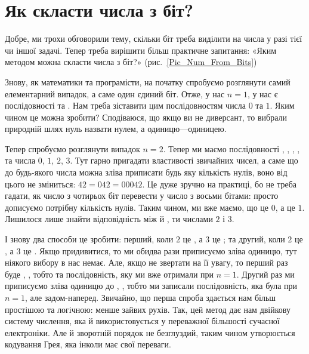 \section{Як скласти числа з біт?}

Добре, ми трохи обговорили тему, скільки біт треба виділити на числа у разі тієї чи іншої задачі.
Тепер треба вирішити більш практичне запитання: «Яким методом можна скласти числа з біт?» (рис.~\ref{Pic_Num_From_Bits})


Знову, як математики та програмісти, на початку спробуємо розглянути самий елементарний випадок, а саме один єдиний біт.
Отже, у нас $n=1$, у нас є послідовності  та .
Нам треба зіставити цим послідовностям числа $0$ та $1$.
Яким чином це можна зробити?
Сподіваюся, що якщо ви не диверсант, то вибрали природній шлях нуль назвати нулем, а одиницю---одиницею.

Тепер спробуємо розглянути випадок $n=2$.
Тепер ми маємо послідовності , , , , та числа $0$, $1$, $2$, $3$.
Тут гарно пригадати властивості звичайних чисел, а саме що до будь-якого числа можна зліва приписати будь яку кількість нулів, воно від цього не зміниться: $42 = 042 = 00042$.
Це дуже зручно на практиці, бо не треба гадати, як число з чотирьох біт перевести у число з восьми бітами: просто дописуємо потрібну кількість нулів.
Таким чином, ми вже маємо, що  це $0$, а  це $1$.
Лишилося лише знайти відповідність між  й , ти числами $2$ і $3$.

І знову два способи це зробити: перший, коли $2$ це , а $3$ це ; та другий, коли $2$ це , а $3$ це .
Якщо придивитися, то ми обидва рази приписуємо зліва одиницю, тут ніякого вибору в нас немає.
Але, якщо не звертати на її увагу, то перший раз буде , , тобто та послідовність, яку ми вже отримали при $n=1$.
Другий раз ми приписуємо зліва одиницю до , , тобто ми записали послідовність, яка була при $n=1$, але задом-наперед.
Звичайно, що перша спроба здається нам більш простішою та логічною: менше зайвих рухів.
Так, цей метод дає нам двійкову систему числення, яка й використовується у переважної більшості сучасної електроніки.
Але й зворотній порядок не безглуздий, таким чином утворюється кодування Грея, яка інколи має свої переваги.

